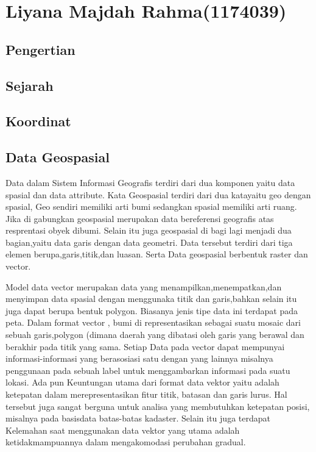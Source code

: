 \section{Liyana Majdah Rahma(1174039)}
\subsection{Pengertian}

\subsection{Sejarah}
\subsection{Koordinat}
\subsection{Data Geospasial}
Data dalam Sistem Informasi Geografis terdiri dari dua komponen yaitu data spasial dan data attribute. Kata Geospasial terdiri dari dua katayaitu geo dengan spasial, Geo sendiri memiliki arti bumi sedangkan spasial memiliki arti ruang. Jika di gabungkan geospasial merupakan data bereferensi geografis atas resprentasi obyek dibumi. Selain itu juga geospasial  di bagi lagi menjadi dua bagian,yaitu data garis dengan data geometri. Data tersebut terdiri dari tiga elemen berupa,garis,titik,dan luasan. Serta Data geospasial berbentuk raster dan vector.

Model data vector merupakan data yang menampilkan,menempatkan,dan menyimpan data spasial dengan menggunaka titik dan garis,bahkan selain itu juga dapat berupa bentuk polygon. Biasanya jenis tipe data ini terdapat pada peta. Dalam format vector , bumi di representasikan sebagai suatu mosaic dari sebuah garis,polygon (dimana daerah yang dibatasi oleh garis yang berawal dan berakhir pada titik yang sama. Setiap Data pada vector dapat mempunyai informasi-informasi yang berasosiasi satu dengan yang lainnya misalnya penggunaan pada sebuah label untuk menggambarkan informasi pada suatu lokasi. Ada pun Keuntungan utama dari format data vektor yaitu adalah ketepatan dalam merepresentasikan fitur titik, batasan dan garis lurus. Hal tersebut juga  sangat berguna untuk analisa yang membutuhkan ketepatan posisi, misalnya pada basisdata batas-batas kadaster. Selain itu juga terdapat Kelemahan  saat menggunakan data vektor yang utama adalah ketidakmampuannya dalam mengakomodasi perubahan gradual.


